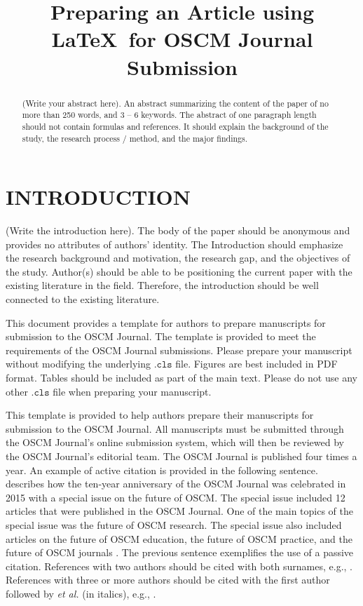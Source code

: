 \documentclass[preprint]{oscmjournal}
\title{Preparing an Article using \LaTeX~for OSCM Journal Submission}
\begin{document}
\maketitle

\begin{abstract}
    (Write your abstract here). An abstract summarizing the content of the paper of no more than 250 words, and 3 – 6 keywords. The abstract of one paragraph length should not contain formulas and references. It should explain the background of the study, the research process / method, and the major findings.
\end{abstract}


\section{INTRODUCTION}\label{sec:introduction}
(Write the introduction here). The body of the paper should be anonymous and provides no attributes of authors’ identity. 
The Introduction should emphasize the research background and motivation, the research gap, and the objectives of the study. Author(s) should be able to be positioning the current paper with the existing literature in the field. Therefore, the introduction should be well connected to the existing literature.

This document provides a template for authors to prepare manuscripts for submission to the OSCM Journal. The template is provided to meet the requirements of the OSCM Journal submissions. Please prepare your manuscript without modifying the underlying $\texttt{.cls}$ file. Figures are best included in PDF format. Tables should be included as part of the main text. Please do not use any other $\texttt{.cls}$ file when preparing your manuscript. 

This template is provided to help authors prepare their manuscripts for submission to the OSCM Journal. All manuscripts must be submitted through the OSCM Journal's online submission system, which will then be reviewed by the OSCM Journal's editorial team. The OSCM Journal is published four times a year. An example of active citation is provided in the following sentence. \textcite{pujawan2016operations} describes how the ten-year anniversary of the OSCM Journal was celebrated in 2015 with a special issue on the future of OSCM. The special issue included 12 articles that were published in the OSCM Journal. One of the main topics of the special issue was the future of OSCM research. The special issue also included articles on the future of OSCM education, the future of OSCM practice, and the future of OSCM journals \parencite{pujawan2016operations}. The previous sentence exemplifies the use of a passive citation. References with two authors should be cited with both surnames, e.g., \parencite{devi2021social}. References with three or more authors should be cited with the first author followed by \textit{et al.} (in italics), e.g., \parencite{okongwu2008advanced}. 
\end{document}
